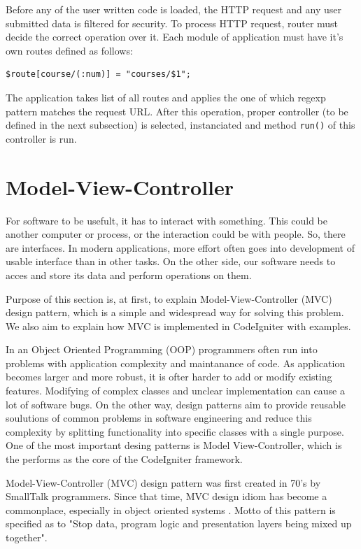 Before any of the user written code is loaded, the HTTP request and any user submitted data is filtered for security. To process HTTP request, router must decide the correct operation over it. Each module of application must have it's own routes defined as follows:

\begin{lstlisting}[basicstyle=\small,caption={CodeIgniter routing}]
$route[course/(:num)] = "courses/$1";
\end{lstlisting}

The application takes list of all routes and applies the one of which regexp pattern matches the request URL. After this operation, proper controller (to be defined in the next subsection) is selected, instanciated and method \texttt{run()} of this controller is run.

\section{Model-View-Controller}
For software to be usefult, it has to interact with something. This could be another computer or process, or the interaction could be with people. So, there are interfaces. In modern applications, more effort often goes into development of usable interface than in other tasks. On the other side, our software needs to acces and store its data and perform operations on them.

Purpose of this section is, at first, to explain Model-View-Controller (MVC) design pattern, which is a simple and widespread way for solving this problem. We also aim to explain how MVC is implemented in CodeIgniter with examples.

In an Object Oriented Programming (OOP) programmers often run into problems with application complexity and maintanance of code. As application becomes larger and more robust, it is ofter harder to add or modify existing features. Modifying of complex classes and unclear implementation can cause a lot of software bugs. On the other way, design patterns aim to provide reusable soulutions of common problems in software engineering and reduce this complexity by splitting functionality into specific classes with a single purpose. One of the most important desing patterns is Model View-Controller, which is the performs as the core of the CodeIgniter framework.

Model-View-Controller (MVC) design pattern was first created in 70’s by SmallTalk programmers. Since that time, MVC design idiom has become a commonplace, especially in object oriented systems \cite{deacon2009model}. Motto of this pattern is specified as to "Stop data, program logic and presentation layers being mixed up together".

